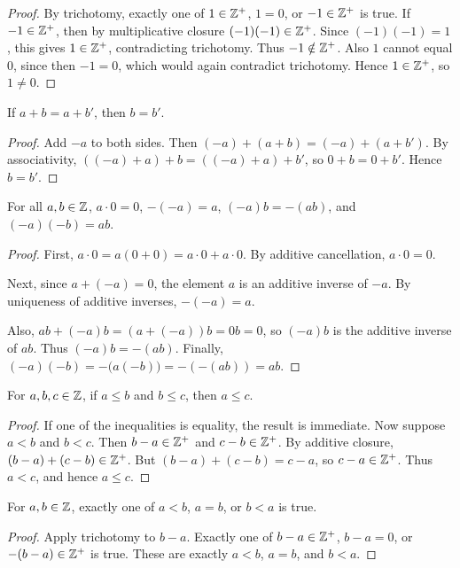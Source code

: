 \begin{proof}
By trichotomy, exactly one of $1\in\mathbb{Z}^+$, $1=0$, or $-1\in\mathbb{Z}^+$ is true. If $-1\in\mathbb{Z}^+$, then by multiplicative closure $(-1)(-1)\in\mathbb{Z}^+$. Since $(-1)(-1)=1$, this gives $1\in\mathbb{Z}^+$, contradicting trichotomy. Thus $-1\notin\mathbb{Z}^+$. Also $1$ cannot equal $0$, since then $-1=0$, which would again contradict trichotomy. Hence $1\in\mathbb{Z}^+$, so $1\neq0$.
\end{proof}

\begin{lemma}
If $a+b=a+b'$, then $b=b'$.
\end{lemma}

\begin{proof}
Add $-a$ to both sides. Then $(-a)+(a+b)=(-a)+(a+b')$. By associativity, $((-a)+a)+b=((-a)+a)+b'$, so $0+b=0+b'$. Hence $b=b'$.
\end{proof}

\begin{lemma}
For all $a,b\in\mathbb{Z}$, $a\cdot0=0$, $-(-a)=a$, $(-a)b=-(ab)$, and $(-a)(-b)=ab$.
\end{lemma}

\begin{proof}
First, $a\cdot0=a(0+0)=a\cdot0+a\cdot0$. By additive cancellation, $a\cdot0=0$.

Next, since $a+(-a)=0$, the element $a$ is an additive inverse of $-a$. By uniqueness of additive inverses, $-(-a)=a$.

Also, $ab+(-a)b=(a+(-a))b=0b=0$, so $(-a)b$ is the additive inverse of $ab$. Thus $(-a)b=-(ab)$. Finally, $(-a)(-b)=-\big(a(-b)\big)=-(-(ab))=ab$.
\end{proof}

\begin{lemma}
For $a,b,c\in\mathbb{Z}$, if $a\leq b$ and $b\leq c$, then $a\leq c$.
\end{lemma}

\begin{proof}
If one of the inequalities is equality, the result is immediate. Now suppose $a<b$ and $b<c$. Then $b-a\in\mathbb{Z}^+$ and $c-b\in\mathbb{Z}^+$. By additive closure, $(b-a)+(c-b)\in\mathbb{Z}^+$. But $(b-a)+(c-b)=c-a$, so $c-a\in\mathbb{Z}^+$. Thus $a<c$, and hence $a\leq c$.
\end{proof}

\begin{lemma}
For $a,b\in\mathbb{Z}$, exactly one of $a<b$, $a=b$, or $b<a$ is true.
\end{lemma}

\begin{proof}
Apply trichotomy to $b-a$. Exactly one of $b-a\in\mathbb{Z}^+$, $b-a=0$, or $-(b-a)\in\mathbb{Z}^+$ is true. These are exactly $a<b$, $a=b$, and $b<a$.
\end{proof}

